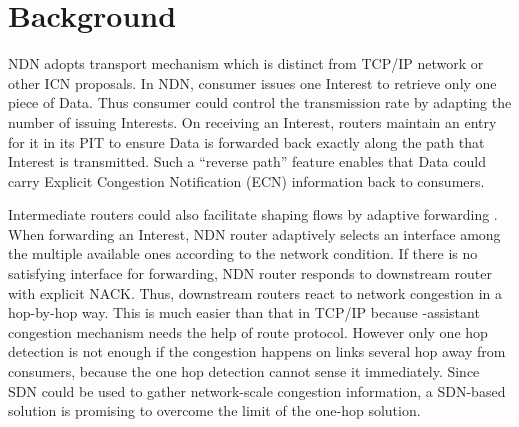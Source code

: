 
\section{Background}


NDN adopts transport mechanism \cite{NDN, Adaptive} which is distinct from TCP/IP network or other ICN proposals. In NDN, consumer issues one Interest to retrieve only one piece of Data. Thus consumer could control the transmission rate by adapting the number of issuing Interests. On receiving an Interest, routers maintain an entry for it in its PIT to ensure Data is forwarded back exactly along the path that Interest is transmitted. Such a ``reverse path'' feature enables that Data could carry Explicit Congestion Notification (ECN) information back to consumers.

Intermediate routers could also facilitate shaping flows by adaptive forwarding \cite{Adaptive}. When forwarding an Interest, NDN router adaptively selects an interface among the multiple available ones according to the network condition. If there is no satisfying interface for forwarding, NDN router responds to downstream router with explicit NACK. Thus, downstream routers react to network congestion in a hop-by-hop way. This is much easier than that in TCP/IP because -assistant congestion mechanism needs the help of route protocol\cite{selfish}. However only one hop detection is not enough if the congestion happens on links several hop away from consumers, because the one hop detection cannot sense it immediately. Since SDN\cite{SDN} could be used to gather network-scale congestion information, a SDN-based solution is promising to overcome the limit of the one-hop solution.



